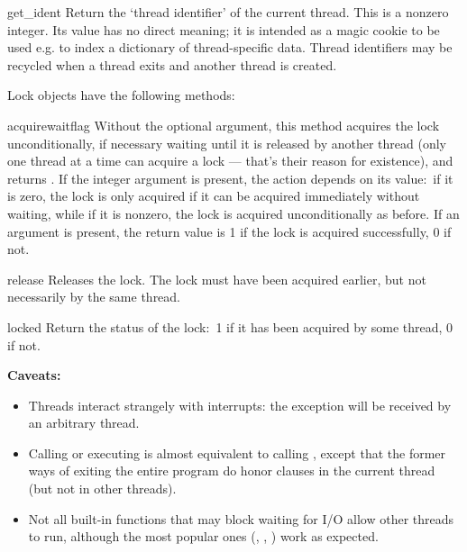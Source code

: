 \begin{funcdesc}{get_ident}{}
Return the `thread identifier' of the current thread.  This is a
nonzero integer.  Its value has no direct meaning; it is intended as a
magic cookie to be used e.g. to index a dictionary of thread-specific
data.  Thread identifiers may be recycled when a thread exits and
another thread is created.
\end{funcdesc}

Lock objects have the following methods:

\renewcommand{\indexsubitem}{(lock method)}
\begin{funcdesc}{acquire}{waitflag}
Without the optional argument, this method acquires the lock
unconditionally, if necessary waiting until it is released by another
thread (only one thread at a time can acquire a lock --- that's their
reason for existence), and returns .  If the integer
 argument is present, the action depends on its value:\
if it is zero, the lock is only acquired if it can be acquired
immediately without waiting, while if it is nonzero, the lock is
acquired unconditionally as before.  If an argument is present, the
return value is 1 if the lock is acquired successfully, 0 if not.
\end{funcdesc}

\begin{funcdesc}{release}{}
Releases the lock.  The lock must have been acquired earlier, but not
necessarily by the same thread.
\end{funcdesc}

\begin{funcdesc}{locked}{}
Return the status of the lock:\ 1 if it has been acquired by some
thread, 0 if not.
\end{funcdesc}

{\bf Caveats:}

\begin{itemize}
\item
Threads interact strangely with interrupts: the
 exception will be received by an arbitrary
thread.

\item
Calling  or executing
 is almost equivalent to calling
\code{thread.exit_prog(\var{status})}, except that the former ways of
exiting the entire program do honor \code{finally} clauses in the
current thread (but not in other threads).

\item
Not all built-in functions that may block waiting for I/O allow other
threads to run, although the most popular ones (\code{sleep},
, ) work as expected.

\end{itemize}
